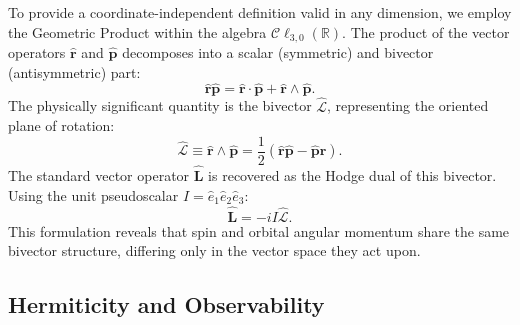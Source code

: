 To provide a coordinate-independent definition valid in any dimension, we employ
the Geometric Product within the algebra $\mathcal{C}\ell_{3,0}(\mathbb{R})$.
The product of the vector operators $\hat{\mathbf{r}}$ and $\hat{\mathbf{p}}$
decomposes into a scalar (symmetric) and bivector (antisymmetric) part:
\begin{equation}
  \hat{\mathbf{r}}\hat{\mathbf{p}} = \hat{\mathbf{r}} \cdot \hat{\mathbf{p}} +
  \hat{\mathbf{r}} \wedge \hat{\mathbf{p}}.
\end{equation}
The physically significant quantity is the bivector $\hat{\mathcal{L}}$,
representing the oriented plane of rotation:
\begin{equation}
  \hat{\mathcal{L}} \equiv \hat{\mathbf{r}} \wedge \hat{\mathbf{p}} =
  \frac{1}{2}(\hat{\mathbf{r}}\hat{\mathbf{p}} -
  \hat{\mathbf{p}}\hat{\mathbf{r}}).
\end{equation}
The standard vector operator $\hat{\mathbf{L}}$ is recovered as the Hodge
dual of this bivector. Using the unit pseudoscalar $I = \hat{e}_1 \hat{e}_2
\hat{e}_3$:
\begin{equation}
  \hat{\mathbf{L}} = -i I \hat{\mathcal{L}}.
\end{equation}
This formulation reveals that spin and orbital angular momentum share the same
bivector structure, differing only in the vector space they act upon.

\subsection{Hermiticity and Observability}


